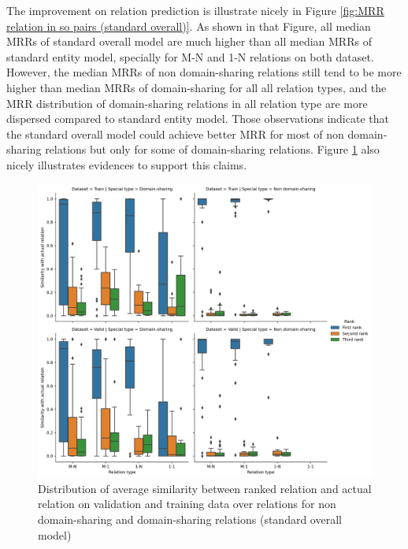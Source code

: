 The improvement on relation prediction is illustrate nicely in Figure \ref{fig:MRR relation in so pairs (standard overall)}. As shown in that Figure, all median MRRs of standard overall model are much higher than all median MRRs of standard entity model, specially for M-N and 1-N relations on both dataset. However, the median MRRs of non domain-sharing relations still tend to be more higher than median MRRs of domain-sharing for all all relation types, and the MRR distribution of domain-sharing relations in all relation type are more dispersed compared to standard entity model. Those observations indicate that the standard overall model could achieve better MRR for most of non domain-sharing relations but only for some of domain-sharing relations. Figure \ref{fig:Jaccard similarity (standard overall)} also nicely illustrates evidences to support this claims.

\begin{figure}[!htbp]
	\begin{center}
	\includegraphics[width=\linewidth]{Images/jaccard_similarity (standard overall).png}
	\caption[Distribution of average similarity (standard overall)]{Distribution of average similarity between ranked relation and actual relation on validation and training data over relations for non domain-sharing and domain-sharing relations (standard overall model)}
	\label{fig:Jaccard similarity (standard overall)}
	\end{center}
\end{figure}

